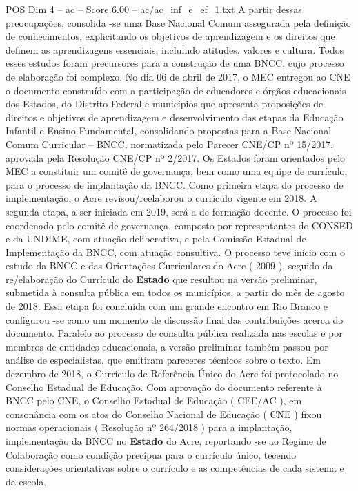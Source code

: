 \begin{textsample}{POS Dim 4 – ac – Score 6.00 – ac/ac\_inf\_e\_ef\_1.txt}
A partir dessas preocupações, consolida -se uma Base Nacional Comum assegurada pela definição de conhecimentos, explicitando os objetivos de aprendizagem e os direitos que definem as aprendizagens essenciais, incluindo atitudes, valores e cultura.
Todos esses estudos foram precursores para a construção de uma BNCC, cujo processo de elaboração foi complexo.
No dia 06 de abril de 2017, o MEC entregou ao CNE o documento construído com a participação de educadores e órgãos educacionais dos Estados, do Distrito Federal e municípios que apresenta proposições de direitos e objetivos de aprendizagem e desenvolvimento das etapas da Educação Infantil e Ensino Fundamental, consolidando propostas para a Base Nacional Comum Curricular – BNCC, normatizada pelo Parecer CNE/CP nº 15/2017, aprovada pela Resolução CNE/CP nº 2/2017.
Os Estados foram orientados pelo MEC a constituir um comitê de governança, bem como uma equipe de currículo, para o processo de implantação da BNCC.
Como primeira etapa do processo de implementação, o Acre revisou/reelaborou o currículo vigente em 2018.
A segunda etapa, a ser iniciada em 2019, será a de formação docente.
O processo foi coordenado pelo comitê de governança, composto por representantes do CONSED e da UNDIME, com atuação deliberativa, e pela Comissão Estadual de Implementação da BNCC, com atuação consultiva.
O processo teve início com o estudo da BNCC e das Orientações Curriculares do Acre ( 2009 ), seguido da re/elaboração do Currículo do \textbf{Estado} que resultou na versão preliminar, submetida à consulta pública em todos os municípios, a partir do mês de agosto de 2018.
Essa etapa foi concluída com um grande encontro em Rio Branco e configurou -se como um momento de discussão final das contribuições acerca do documento.
Paralelo ao processo de consulta pública realizada nas escolas e por membros de entidades educacionais, a versão preliminar também passou por análise de especialistas, que emitiram pareceres técnicos sobre o texto.
Em dezembro de 2018, o Currículo de Referência Único do Acre foi protocolado no Conselho Estadual de Educação.
Com aprovação do documento referente à BNCC pelo CNE, o Conselho Estadual de Educação ( CEE/AC ), em consonância com os atos do Conselho Nacional de Educação ( CNE ) fixou normas operacionais ( Resolução nº 264/2018 ) para a implantação, implementação da BNCC no \textbf{Estado} do Acre, reportando -se ao Regime de Colaboração como condição precípua para o currículo único, tecendo considerações orientativas sobre o currículo e as competências de cada sistema e da escola.

\end{textsample}
